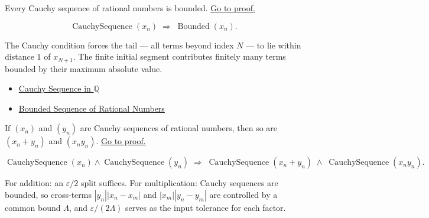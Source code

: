 \begin{theorem}
\label{thm:cauchy-bounded-q}
Every Cauchy sequence of rational numbers is bounded.
\hyperref[prf:cauchy-bounded-q]{Go to proof.}
\end{theorem}

\begin{remark*}
\[
\operatorname{CauchySequence}(x_n)
\;\Longrightarrow\;
\operatorname{Bounded}(x_n).
\]
\end{remark*}

\begin{remark*}[Interpretation]
The Cauchy condition forces the tail --- all terms beyond index $N$ --- to
lie within distance $1$ of $x_{N+1}$. The finite initial segment contributes
finitely many terms bounded by their maximum absolute value.
\end{remark*}

\begin{remark*}[Dependencies]
\begin{itemize}
  \item \hyperref[def:cauchy-rational]{Cauchy Sequence in $\mathbb{Q}$}
  \item \hyperref[def:bounded-sequence-q]{Bounded Sequence of Rational Numbers}
\end{itemize}
\end{remark*}

\begin{theorem}
\label{thm:cauchy-closed-operations-q}
If $(x_n)$ and $(y_n)$ are Cauchy sequences of rational numbers, then so
are $(x_n + y_n)$ and $(x_n y_n)$.
\hyperref[prf:cauchy-closed-operations-q]{Go to proof.}
\end{theorem}

\begin{remark*}
\[
\operatorname{CauchySequence}(x_n) \land \operatorname{CauchySequence}(y_n)
\;\Longrightarrow\;
\operatorname{CauchySequence}(x_n + y_n)
\;\land\;
\operatorname{CauchySequence}(x_n y_n).
\]
\end{remark*}

\begin{remark*}[Interpretation]
For addition: an $\varepsilon/2$ split suffices. For multiplication: Cauchy
sequences are bounded, so cross-terms $|y_n||x_n - x_m|$ and
$|x_m||y_n - y_m|$ are controlled by a common bound $\Lambda$, and
$\varepsilon/(2\Lambda)$ serves as the input tolerance for each factor.
\end{remark*}


